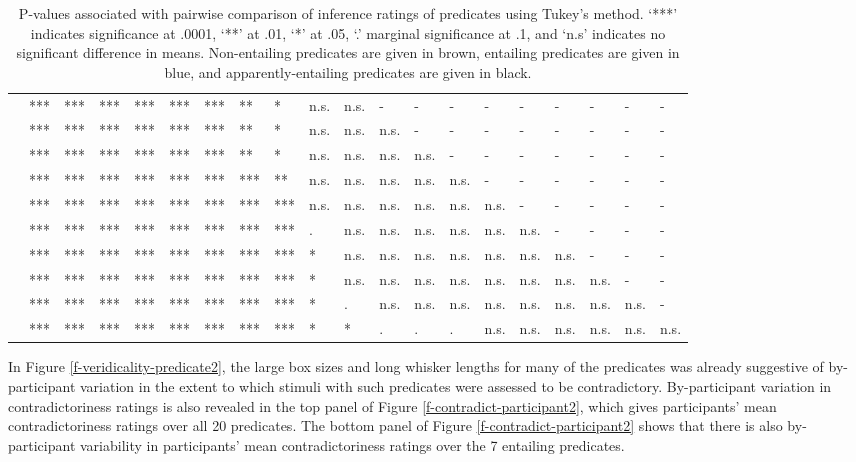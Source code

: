 \documentclass[11pt,fleqn]{article}
\newcommand{\6}{\mbox{$[\hspace*{-.6mm}[$}}
\newcommand{\9}{\mbox{$]\hspace*{-.6mm}]$}}
\begin{document}
\begin{landscape}
\begin{table}[h!]
\begin{tabular}{l l l l l l l l l l l l l l l l l l l l }
\color{black}{\em acknowledge}\color{black}	& *** & *** & *** & *** & *** & *** & ** & * & n.s. & n.s. & - & - & - & - & - & - & - & - & - \\
\color{black}{\em admit}\color{black}			& *** & *** & *** & *** & *** & *** & ** & * & n.s. & n.s. & n.s. & - & - & - & - & - & - & - & - \\
\color{blue}{\em establish}\color{black}		& *** & *** & *** & *** & *** & *** & ** & * & n.s. & n.s. & n.s. &  n.s. & - & - & - & - & - & - & - \\
\color{black}{\em be annoyed}\color{black}	& *** & *** & *** & *** & *** & *** & *** & ** & n.s. & n.s. & n.s. & n.s. & n.s. & - & - & - & - & - & - \\
\color{black}{\em know}\color{black}		& *** & *** & *** & *** & *** & *** & *** & *** & n.s. & n.s. & n.s. & n.s. & n.s. & n.s. & - & - & - & - & - \\
\color{blue}{\em confirm}\color{black}		& *** & *** & *** & *** & *** & *** & *** & *** & . & n.s. & n.s. & n.s. & n.s. & n.s. & n.s. & - & - & - & - \\
\color{blue}{\em discover}\color{black}			& *** & *** & *** & *** & *** & *** & *** & *** & * & n.s. & n.s. & n.s. & n.s. & n.s.& n.s. & n.s. & - & - & - \\
\color{blue}{\em see}\color{black}			& *** & *** & *** & *** & *** & *** & *** & *** & * & n.s. & n.s. & n.s. & n.s. & n.s. & n.s. & n.s. & n.s. & - & - \\
\color{black}{\em be right}\color{black}			& *** & *** & *** & *** & *** & *** & *** & *** & * & . & n.s. & n.s. & n.s. & n.s. & n.s. & n.s. & n.s. & n.s. & -  \\
\color{blue}{\em prove}\color{black}		& *** & *** & *** & *** & *** & *** & *** & *** & *  & *  & . & . & . & n.s. & n.s. & n.s. & n.s. & n.s. & n.s.  \\

\bottomrule
\end{tabular}
\caption{P-values associated with pairwise comparison of inference ratings of predicates using Tukey's method. `***' indicates significance at .0001, `**' at .01, `*' at .05, `.' marginal significance at .1, and `n.s' indicates no significant difference in means. Non-entailing predicates are given in brown, entailing predicates are given in blue, and apparently-entailing predicates are given in black.}\label{t-pairwise2}
\end{table}
\end{landscape}

In Figure \ref{f-veridicality-predicate2}, the large box sizes and long whisker lengths for many of the predicates was already suggestive of by-participant variation in the extent to which stimuli with such predicates were assessed to be contradictory. By-participant variation in contradictoriness ratings is also revealed in the top panel of Figure \ref{f-contradict-participant2}, which gives participants' mean contradictoriness ratings over all 20 predicates. The bottom panel of Figure \ref{f-contradict-participant2} shows that there is also by-participant variability in participants' mean contradictoriness ratings over the 7 entailing predicates.
\end{document}
